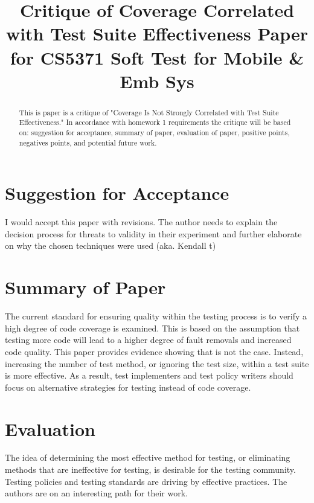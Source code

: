 \documentclass[conference]{IEEEtran}
\begin{document}
\title{Critique of Coverage Correlated with Test Suite Effectiveness Paper\\
for CS5371 Soft Test for Mobile \& Emb Sys}

\author{
}

\maketitle

\begin{abstract}
This is paper is a critique of "Coverage Is Not Strongly Correlated with Test Suite Effectiveness." In accordance with homework 1 requirements the critique will be based on: suggestion for acceptance, summary of paper, evaluation of paper, positive points, negatives points, and potential future work. 
\end{abstract}

\IEEEpeerreviewmaketitle

\section{Suggestion for Acceptance}
I would accept this paper with revisions. The author needs to explain the decision process for threats to validity in their experiment and further elaborate on why the chosen techniques were used (aka.	Kendall t)

\section{Summary of Paper}
The current standard for ensuring quality within the testing process is to verify a high degree of code coverage is examined. This is based on the assumption that testing more code will lead to a higher degree of fault removals and increased code quality. This paper provides evidence showing that is not the case. Instead, increasing the number of test method, or ignoring the test size, within a test suite is more effective. As a result, test implementers and test policy writers should focus on alternative strategies for testing instead of code coverage. 

\section{Evaluation}
The idea of determining the most effective method for testing, or eliminating methods that are ineffective for testing, is desirable for the testing community. Testing policies and testing standards are driving by effective practices. The authors are on an interesting path for their work.
\end{document}
